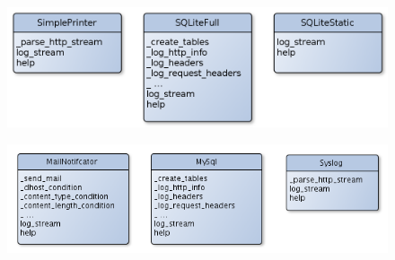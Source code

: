 \begin{figure}[hbtp]
    \centering
	\includegraphics[scale=0.40]{img/Plugins1.png} 
\end{figure}

\begin{figure}[hbtp]
    \centering
	\includegraphics[width=\textwidth]{img/Plugins2.png} 
\end{figure}
